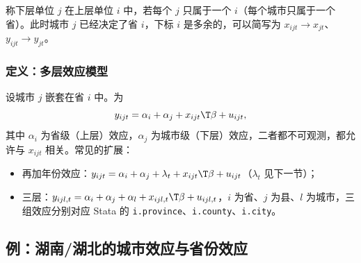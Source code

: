 称下层单位 $j$ 在上层单位 $i$ 中，若每个 $j$ 只属于一个 $i$（每个城市只属于一个省）。此时城市 $j$ 已经决定了省 $i$，下标 $i$ 是多余的，可以简写为 $x_{ijt}\to x_{jt}$、$y_{ijt}\to y_{jt}$。

\subsubsection{定义：多层效应模型}

\begin{defn}[多层效应模型]\label{def:U10b-multi}
设城市 $j$ 嵌套在省 $i$ 中。为
\begin{equation}\label{eq:U10b-multi}
y_{ijt}=\alpha_i+\alpha_j+x_{ijt}\T\beta+u_{ijt},
\end{equation}
其中 $\alpha_i$ 为省级（上层）效应，$\alpha_j$ 为城市级（下层）效应，二者都不可观测，都允许与 $x_{ijt}$ 相关。常见的扩展：
\begin{itemize}
  \item 再加年份效应：$y_{ijt}=\alpha_i+\alpha_j+\lambda_t+x_{ijt}\T\beta+u_{ijt}$（$\lambda_t$ 见下一节）；
  \item 三层：$y_{ijl,t}=\alpha_i+\alpha_j+\alpha_l+x_{ijl,t}\T\beta+u_{ijl,t}$，$i$ 为省、$j$ 为县、$l$ 为城市，三组效应分别对应 Stata 的 \texttt{i.province}、\texttt{i.county}、\texttt{i.city}。
\end{itemize}
\end{defn}

\subsection{例：湖南/湖北的城市效应与省份效应}

